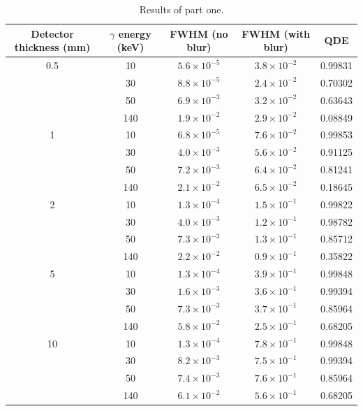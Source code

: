\documentclass[a4paper]{article}
\begin{document}
\begin{table}
  \centering
  \begin{tabular}{|c|c|c|c|c|}
   \hline
   Detector thickness (mm) & $\gamma$ energy (keV) & FWHM (no blur) & FWHM (with blur) & QDE \\
   \hline
   0.5 & 10 & $5.6 \times 10^{-5}$ & $3.8 \times 10^{-2}$ & 0.99831 \\
   \hline
    & 30 & $8.8 \times 10^{-5}$ & $2.4 \times 10^{-2}$ & 0.70302 \\
    \hline
    & 50 & $6.9 \times 10^{-3}$ & $3.2 \times 10^{-2}$ & 0.63643 \\
    \hline
    & 140 & $1.9 \times 10^{-2}$ & $2.9 \times 10^{-2}$ & 0.08849 \\
    \hline
   1 & 10 & $6.8 \times 10^{-5}$ & $7.6 \times 10^{-2}$ & 0.99853\\
   \hline
    & 30 & $4.0 \times 10^{-3}$ & $5.6 \times 10^{-2}$ & 0.91125\\
    \hline
    & 50 & $7.2 \times 10^{-3}$ & $6.4 \times 10^{-2}$ & 0.81241\\
    \hline
    & 140 & $2.1 \times 10^{-2}$ & $6.5 \times 10^{-2}$ & 0.18645\\
    \hline
   2 & 10 & $1.3 \times 10^{-4}$ & $1.5 \times 10^{-1}$ & 0.99822\\
   \hline
    & 30 & $4.0 \times 10^{-3}$ & $1.2 \times 10^{-1}$ & 0.98782\\
    \hline
    & 50 & $7.3 \times 10^{-3}$ & $1.3 \times 10^{-1}$ & 0.85712\\
    \hline
    & 140 & $2.2 \times 10^{-2}$ & $0.9 \times 10^{-1}$  & 0.35822\\
    \hline
   5 & 10 & $1.3 \times 10^{-4}$ & $3.9 \times 10^{-1}$ & 0.99848\\
   \hline
    & 30 & $1.6 \times 10^{-3}$ & $3.6 \times 10^{-1}$ & 0.99394\\
    \hline
    & 50 & $7.3 \times 10^{-3}$ & $3.7 \times 10^{-1}$ & 0.85964\\
    \hline
    & 140 & $5.8 \times 10^{-2}$ & $2.5 \times 10^{-1}$ & 0.68205\\
    \hline
   10 & 10 & $1.3 \times 10^{-4}$ & $7.8 \times 10^{-1}$ & 0.99848\\
   \hline
    & 30 & $8.2 \times 10^{-3}$ & $7.5 \times 10^{-1}$ & 0.99394\\
    \hline
    & 50 & $7.4 \times 10^{-3}$ & $7.6 \times 10^{-1}$ & 0.85964\\
    \hline
    & 140 & $6.1 \times 10^{-2}$ & $5.6 \times 10^{-1}$ & 0.68205\\
    \hline
  \end{tabular}
  \caption{Results of part one.}
  \label{tab:part_one}
\end{table}
\end{document}
